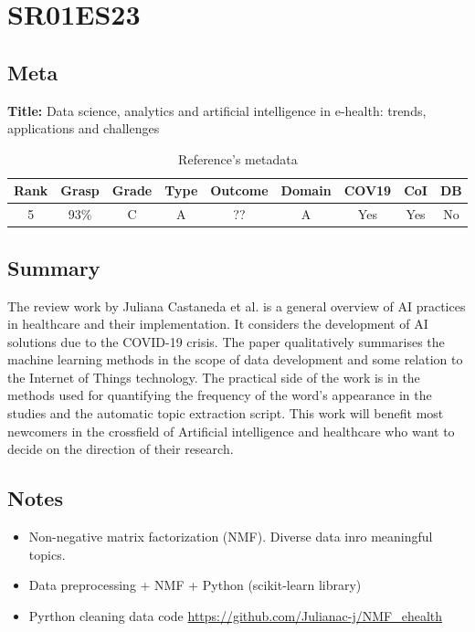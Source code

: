 \section{ SR01ES23 }


\subsection{Meta}

    \textbf{Title:}
    Data science, analytics and artificial intelligence in e-health: trends, applications and challenges

    \begin{table}[H]
        \centering
        \begin{tabular}{|c|c|c|c|c|c|c|c|c|}
            \hline
                \textbf{Rank} & \textbf{Grasp} & \textbf{Grade} & \textbf{Type} & \textbf{Outcome} & \textbf{Domain} & \textbf{COV19} & \textbf{CoI} & \textbf{DB} \\
            \hline
                5 & 93\% & C & A & ?? & A & Yes & Yes & No \\
            \hline
        \end{tabular}
        \caption{Reference's metadata}
        \label{tab:SR01ES23}
    \end{table}

\subsection{Summary}
    The review work by Juliana Castaneda et al. \cite{x249} is a general overview of AI practices in healthcare and their implementation. It considers the development of AI solutions due to the COVID-19 crisis. The paper qualitatively summarises the machine learning methods in the scope of data development and some relation to the Internet of Things technology. The practical side of the work is in the methods used for quantifying the frequency of the word's appearance in the studies and the automatic topic extraction script. This work will benefit most newcomers in the crossfield of Artificial intelligence and healthcare who want to decide on the direction of their research.

\subsection{Notes}
    \begin{itemize}
        \item Non-negative matrix factorization (NMF). Diverse data inro meaningful topics.
        \item Data preprocessing + NMF + Python (scikit-learn library)
        \item Pyrthon cleaning data code \url{https://github.com/Julianac-j/NMF_ehealth}
    \end{itemize}


